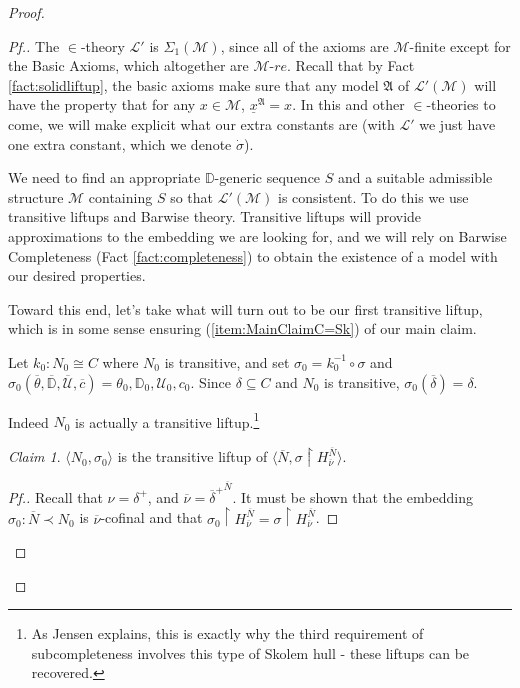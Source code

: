 \documentclass{amsart}
\theoremstyle{definition}
\theoremstyle{remark}
\newtheorem{claimno}{Claim}
\newcommand{\M}{\mathcal{M}}
\newcommand{\D}{\mathbb{D}}
\newcommand{\N}{{\overline{N}}}
\newcommand{\U}{\mathcal{U}}
\begin{document}
\begin{proof}
\begin{proof}[Pf.]
The $\in$-theory $\mathcal L'$ is $\Sigma_1(\M)$, since all of the axioms are $\M$-finite except for the \textsf{Basic Axioms}, which altogether are $\M$-$re$. Recall that by Fact \ref{fact:solidliftup}, the basic axioms make sure that any model $\mathfrak A$ of $\mathcal L'(\M)$ will have the property that for any $x \in \M$, $\underline x^{\mathfrak A}=x$. In this and other $\in$-theories to come, we will make explicit what our extra constants are (with $\mathcal L'$ we just have one extra constant, which we denote $\dot \sigma$).

We need to find an appropriate $\D$-generic sequence $S$ and a suitable admissible structure $\M$ containing $S$ so that $\mathcal L'(\M)$ is consistent. To do this we use transitive liftups and Barwise theory. Transitive liftups will provide approximations to the embedding we are looking for, and we will rely on Barwise Completeness (Fact \ref{fact:completeness}) to obtain the existence of a model with our desired properties. 

Toward this end, let's take what will turn out to be our first transitive liftup, which is in some sense ensuring (\ref{item:MainClaimC=Sk}) of our main claim.

Let $k_0 : N_0 \cong C$ where $N_0$ is transitive, and set $\sigma_0 = k_0^{-1} \circ \sigma$ and $\sigma_0(\overline \theta, \overline{\D}, \overline{\U}, \overline c) = \theta_0, \D_0, \U_0, c_0.$
Since $\delta \subseteq C$ and $N_0$ is transitive, $\sigma_0(\overline \delta)=\delta$. 

Indeed $N_0$ is actually a transitive liftup.\footnote{As Jensen {\cite[Lemma 5.3]{Jensen:2014}} explains, this is exactly why the third requirement of subcompleteness involves this type of Skolem hull - these liftups can be recovered.}

\begin{claimno} \label{claim:N0isliftupofN} $\langle N_0, \sigma_0 \rangle$ is the transitive liftup of $\langle \N, \sigma \upharpoonright H_{\overline \nu}^{\N} \rangle$. \end{claimno}
\begin{proof}[Pf.] Recall that $\nu=\delta^+$, and $\overline \nu={\overline \delta^+}^{\N}$. It must be shown that the embedding $\sigma_0: \overline N \prec N_0$ is $\overline \nu$-cofinal and that $\sigma_0 \upharpoonright H_{\overline \nu}^{\N}=\sigma \upharpoonright H_{\overline \nu}^{\overline N}$. 


\end{proof}
\end{proof}
\end{proof}
\end{document}
